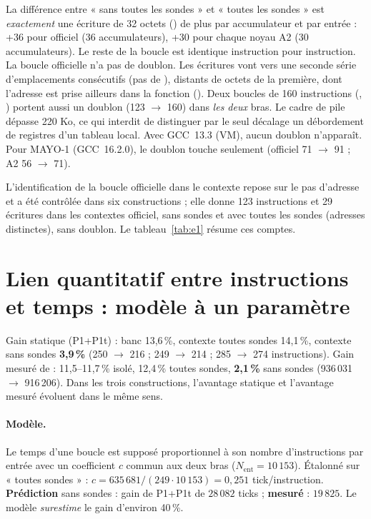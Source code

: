 \F{} La différence entre « sans toutes les sondes » et « toutes les sondes » est \emph{exactement} une écriture de 32 octets () de plus par accumulateur et par entrée : +36 pour  officiel (36 accumulateurs), +30 pour chaque noyau A2 (30 accumulateurs). Le reste de la boucle est identique instruction pour instruction. La boucle officielle  n'a pas de doublon. Les écritures vont vers une seconde série d'emplacements consécutifs (pas de ), distants de  octets de la première, dont l'adresse est prise ailleurs dans la fonction (). Deux boucles de 160 instructions (, ) portent aussi un doublon (123 $\to$ 160) dans \emph{les deux} bras. Le cadre de pile dépasse 220 Ko, ce qui interdit de distinguer par le seul décalage un débordement de registres d'un tableau local. Avec GCC~13.3 (VM), aucun doublon n'apparaît. Pour MAYO-1 (GCC~16.2.0), le doublon touche seulement  (officiel 71 $\to$ 91 ; A2 56 $\to$ 71).

\F{} L'identification de la boucle officielle  dans le contexte repose sur le pas d'adresse  et a été contrôlée dans six constructions ; elle donne 123 instructions et 29 écritures dans les contextes officiel, sans sondes et avec toutes les sondes (adresses distinctes), sans doublon. Le tableau~\ref{tab:e1} résume ces comptes.

\section{Lien quantitatif entre instructions et temps : modèle à un paramètre}
\F{} Gain statique (P1+P1t) : banc 13,6\,\%, contexte toutes sondes 14,1\,\%, contexte sans sondes \textbf{3,9\,\%} (250 $\to$ 216 ; 249 $\to$ 214 ; 285 $\to$ 274 instructions). Gain mesuré de  : 11,5--11,7\,\% isolé, 12,4\,\% toutes sondes, \textbf{2,1\,\%} sans sondes (936\,031 $\to$ 916\,206). Dans les trois constructions, l'avantage statique et l'avantage mesuré évoluent dans le même sens.

\paragraph{Modèle.} Le temps d'une boucle est supposé proportionnel à son nombre d'instructions par entrée avec un coefficient $c$ commun aux deux bras ($N_{\mathrm{ent}}=10\,153$). Étalonné sur « toutes sondes » : $c=635\,681/(249\cdot10\,153)=0{,}251$ tick/instruction. \textbf{Prédiction} sans sondes : gain de P1+P1t de $28\,082$ ticks ; \textbf{mesuré} : $19\,825$. Le modèle \emph{surestime} le gain d'environ 40\,\%.

